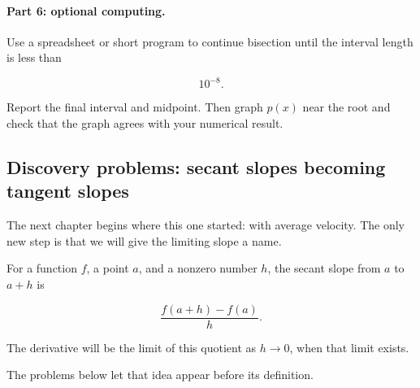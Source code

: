 \paragraph{Part 6: optional computing.}
Use a spreadsheet or short program to continue bisection until the interval length is less than

\[
10^{-8}.
\]

Report the final interval and midpoint.  Then graph \(p(x)\) near the root and check that the graph agrees with your numerical result.

\subsection{Discovery problems: secant slopes becoming tangent slopes}
\label{subsec:secant-slope-discovery}

The next chapter begins where this one started: with average velocity.  The only new step is that we will give the limiting slope a name.

For a function \(f\), a point \(a\), and a nonzero number \(h\), the secant slope from \(a\) to \(a+h\) is

\[
\frac{f(a+h)-f(a)}{h}.
\]

The derivative will be the limit of this quotient as \(h\to0\), when that limit exists.

The problems below let that idea appear before its definition.

